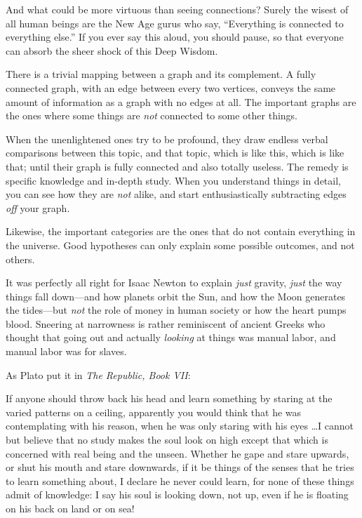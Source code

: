 {
 And what could be more virtuous than seeing connections? Surely
the wisest of all human beings are the New Age gurus who say,
``Everything is connected to everything
else.'' If you ever say this aloud, you should pause,
so that everyone can absorb the sheer shock of this Deep Wisdom.}

{
 There is a trivial mapping between a graph and its complement. A
fully connected graph, with an edge between every two vertices, conveys
the same amount of information as a graph with no edges at all. The
important graphs are the ones where some things are \textit{not}
connected to some other things.}

{
 When the unenlightened ones try to be profound, they draw endless
verbal comparisons between this topic, and that topic, which is like
this, which is like that; until their graph is fully connected and also
totally useless. The remedy is specific knowledge and in-depth study.
When you understand things in detail, you can see how they are
\textit{not} alike, and start enthusiastically subtracting edges
\textit{off} your graph.}

{
 Likewise, the important categories are the ones that do not
contain everything in the universe. Good hypotheses can only explain
some possible outcomes, and not others.}

{
 It was perfectly all right for Isaac Newton to explain
\textit{just} gravity, \textit{just} the way things fall down---and how
planets orbit the Sun, and how the Moon generates the tides---but
\textit{not} the role of money in human society or how the heart pumps
blood. Sneering at narrowness is rather reminiscent of ancient Greeks
who thought that going out and actually \textit{looking} at things was
manual labor, and manual labor was for slaves.}

{
 As Plato put it in \textit{The Republic, Book
VII}:}

{
 If anyone should throw back his head and learn something by
staring at the varied patterns on a ceiling, apparently you would think
that he was contemplating with his reason, when he was only staring
with his eyes \ldots I cannot but believe that no study makes the soul
look on high except that which is concerned with real being and the
unseen. Whether he gape and stare upwards, or shut his mouth and stare
downwards, if it be things of the senses that he tries to learn
something about, I declare he never could learn, for none of these
things admit of knowledge: I say his soul is looking down, not up, even
if he is floating on his back on land or on sea!}

